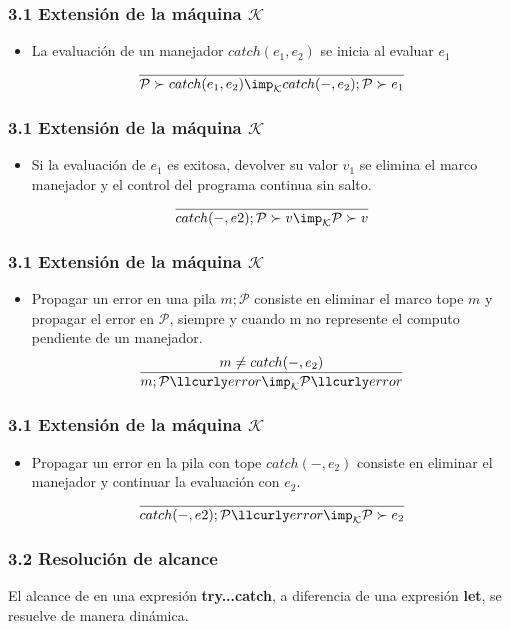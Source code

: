 \documentclass[xcolor=dvipsnames,table,spanish]{beamer}
\begin{document}
\begin{frame}
\frametitle{3.1 Extensión de la máquina $\mathcal{K}$}
\begin{itemize}
		\item La evaluación de un manejador $catch(e_1,e_2)$ se inicia al evaluar $e_1$
        \[ \frac{}{\mathcal{P} \succ catch(e_1,e_2) \imp_{\mathcal{K}} catch(-,e_2);\mathcal{P} \succ e_1} \]
\end{itemize}
\end{frame}

\begin{frame}
\frametitle{3.1 Extensión de la máquina $\mathcal{K}$}
\begin{itemize}
		\item Si la evaluación de $e_1$ es exitosa, devolver su valor $v_1$ se elimina el marco manejador y el control del programa continua sin salto.
        \[ \frac{}{catch(-,e2) ; \mathcal{P} \succ v \imp_{\mathcal{K}} \mathcal{P} \succ v} \]
\end{itemize}
\end{frame}

\begin{frame}
\frametitle{3.1 Extensión de la máquina $\mathcal{K}$}
\begin{itemize}
		\item Propagar un error en una pila $m;\mathcal{P}$  consiste en eliminar el marco tope $m$ y propagar el error
en $\mathcal{P}$, siempre y cuando m no represente el computo pendiente de un manejador.
        \[ \frac{m \neq catch(-,e_2)}{m;\mathcal{P} \llcurly error \imp_{\mathcal{K}} \mathcal{P} \llcurly error} \]
\end{itemize}
\end{frame}

\begin{frame}
\frametitle{3.1 Extensión de la máquina $\mathcal{K}$}
\begin{itemize}
		\item Propagar un error en la pila con tope $catch(-,e_2)$ consiste en eliminar el manejador y continuar la evaluación con $e_2$.
        \[ \frac{}{catch(-,e2);\mathcal{P} \llcurly error \imp_{\mathcal{K}} \mathcal{P} \succ e_2} \]
\end{itemize}
\end{frame}

\begin{frame}
\frametitle{3.2 Resolución de alcance}
El alcance de en una expresión \textbf{try...catch}, a diferencia de una expresión \textbf{let}, se resuelve de manera dinámica.

\end{frame}
\end{document}
